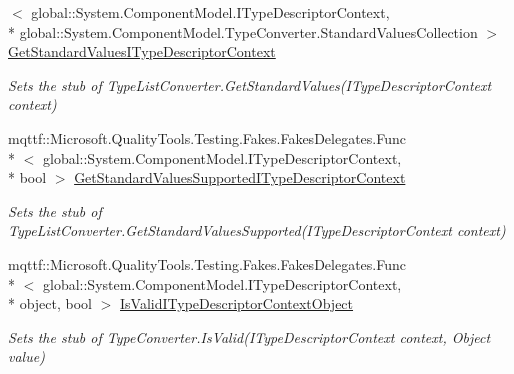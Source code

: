 \begin{DoxyCompactItemize}
$<$ global\-::\-System.\-Component\-Model.\-I\-Type\-Descriptor\-Context, \\*
global\-::\-System.\-Component\-Model.\-Type\-Converter.\-Standard\-Values\-Collection $>$ \hyperlink{class_system_1_1_component_model_1_1_fakes_1_1_stub_type_list_converter_ae06d28848570b52aa9ae53da4b3989d5}{Get\-Standard\-Values\-I\-Type\-Descriptor\-Context}
\begin{DoxyCompactList}\small\item\em Sets the stub of Type\-List\-Converter.\-Get\-Standard\-Values(\-I\-Type\-Descriptor\-Context context)\end{DoxyCompactList}\item 
mqttf\-::\-Microsoft.\-Quality\-Tools.\-Testing.\-Fakes.\-Fakes\-Delegates.\-Func\\*
$<$ global\-::\-System.\-Component\-Model.\-I\-Type\-Descriptor\-Context, \\*
bool $>$ \hyperlink{class_system_1_1_component_model_1_1_fakes_1_1_stub_type_list_converter_a5b01c418e44f58bcbfee06a3c1d50614}{Get\-Standard\-Values\-Supported\-I\-Type\-Descriptor\-Context}
\begin{DoxyCompactList}\small\item\em Sets the stub of Type\-List\-Converter.\-Get\-Standard\-Values\-Supported(\-I\-Type\-Descriptor\-Context context)\end{DoxyCompactList}\item 
mqttf\-::\-Microsoft.\-Quality\-Tools.\-Testing.\-Fakes.\-Fakes\-Delegates.\-Func\\*
$<$ global\-::\-System.\-Component\-Model.\-I\-Type\-Descriptor\-Context, \\*
object, bool $>$ \hyperlink{class_system_1_1_component_model_1_1_fakes_1_1_stub_type_list_converter_a504ff9d2bba6eb6005b4d8c559cbed29}{Is\-Valid\-I\-Type\-Descriptor\-Context\-Object}
\begin{DoxyCompactList}\small\item\em Sets the stub of Type\-Converter.\-Is\-Valid(\-I\-Type\-Descriptor\-Context context, Object value)\end{DoxyCompactList}\end{DoxyCompactItemize}
